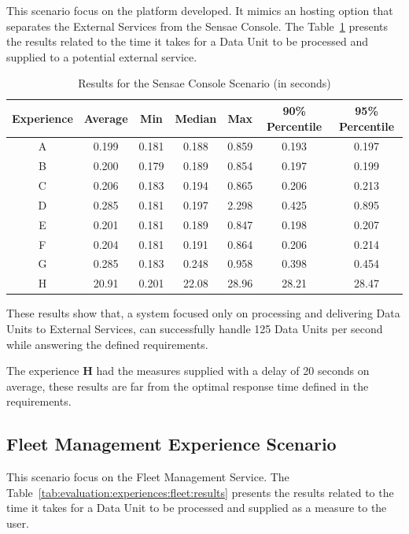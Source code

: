 This scenario focus on the platform developed. It mimics an hosting option that separates the External Services from the Sensae Console. The Table~\ref{tab:evaluation:experiences:platform:results} presents the results related to the time it takes for a Data Unit to be processed and supplied to a potential external service.

\begin{table}[H]
    \caption{Results for the Sensae Console Scenario (in seconds)}
    \label{tab:evaluation:experiences:platform:results}
    \centering
    \begin{tabular}{@{}ccccccc@{}}
    \toprule
    \textbf{Experience} & \textbf{Average} & \textbf{Min} & \textbf{Median} & \textbf{Max} & \textbf{90\% Percentile} & \textbf{95\% Percentile} \\ \midrule
    A & 0.199 & 0.181 & 0.188 & 0.859 & 0.193 & 0.197 \\ \midrule
    B & 0.200 & 0.179 & 0.189 & 0.854 & 0.197 & 0.199 \\ \midrule
    C & 0.206 & 0.183 & 0.194 & 0.865 & 0.206 & 0.213 \\ \midrule
    D & 0.285 & 0.181 & 0.197 & 2.298 & 0.425 & 0.895 \\ \midrule
    E & 0.201 & 0.181 & 0.189 & 0.847 & 0.198 & 0.207 \\ \midrule
    F & 0.204 & 0.181 & 0.191 & 0.864 & 0.206 & 0.214 \\ \midrule
    G & 0.285 & 0.183 & 0.248 & 0.958 & 0.398 & 0.454 \\ \midrule
    H & 20.91 & 0.201 & 22.08 & 28.96 & 28.21 & 28.47 \\ \bottomrule
    \end{tabular}
\end{table}

These results show that, a system focused only on processing and delivering Data Units to External Services, can successfully handle 125 Data Units per second while answering the defined requirements.

The experience \textbf{H} had the measures supplied with a delay of 20 seconds on average, these results are far from the optimal response time defined in the requirements.

\subsection{Fleet Management Experience Scenario}
\label{subsec:evaluation:experiences:fleet}

This scenario focus on the Fleet Management Service. The Table~\ref{tab:evaluation:experiences:fleet:results} presents the results related to the time it takes for a Data Unit to be processed and supplied as a measure to the user.

